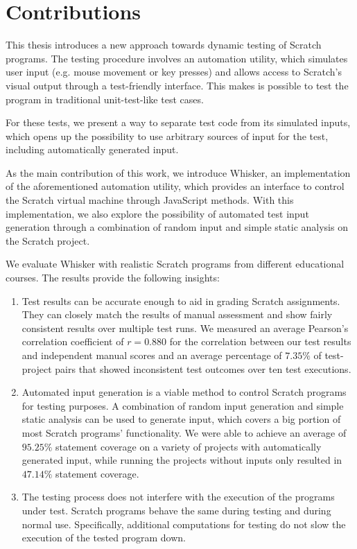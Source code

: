 \section{Contributions}

This thesis introduces a new approach towards dynamic testing of Scratch programs.
The testing procedure involves an automation utility, which simulates user input (e.g. mouse movement or key presses)
and allows access to Scratch's visual output through a test-friendly interface.
This makes is possible to test the program in traditional unit-test-like test cases.
\parspace

For these tests, we present a way to separate test code from its simulated inputs,
which opens up the possibility to use arbitrary sources of input for the test,
including automatically generated input.
\parspace

As the main contribution of this work, we introduce Whisker, an implementation of the aforementioned automation utility,
which provides an interface to control the Scratch virtual machine through JavaScript methods.
With this implementation, we also explore the possibility of automated test input generation through a combination of random input and simple static analysis on the Scratch project.
\parspace

We evaluate Whisker with realistic Scratch programs from different educational courses.
The results provide the following insights:

\begin{enumerate}[(1)]
    \item Test results can be accurate enough to aid in grading Scratch assignments.
        They can closely match the results of manual assessment and show fairly consistent results over multiple test runs.
        We measured an average Pearson's correlation coefficient of $r = 0.880$ for the correlation
        between our test results and independent manual scores and an average percentage of $7.35\%$ of test-project pairs that showed inconsistent test outcomes over ten test executions.
    \item Automated input generation is a viable method to control Scratch programs for testing purposes.
        A combination of random input generation and simple static analysis can be used to generate input, which covers a big portion of most Scratch programs' functionality.
        We were able to achieve an average of $95.25\%$ statement coverage on a variety of projects with automatically generated input,
        while running the projects without inputs only resulted in $47.14\%$ statement coverage.
    \item The testing process does not interfere with the execution of the programs under test.
        Scratch programs behave the same during testing and during normal use.
        Specifically, additional computations for testing do not slow the execution of the tested program down.
\end{enumerate}

